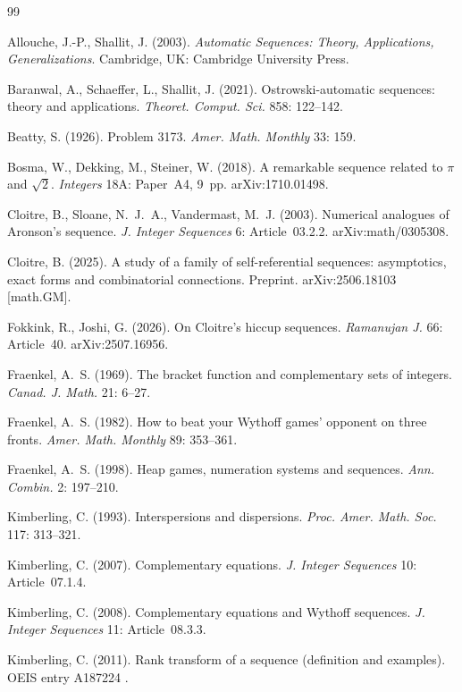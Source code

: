 \documentclass[11pt]{article}
\numberwithin{equation}{section}
\theoremstyle{plain}
\theoremstyle{definition}
\theoremstyle{remark}
\begin{document}
\begin{thebibliography}{99}

Allouche, J.-P., Shallit, J. (2003).
\emph{Automatic Sequences: Theory, Applications, Generalizations}.
Cambridge, UK: Cambridge University Press.

Baranwal, A., Schaeffer, L., Shallit, J. (2021).
Ostrowski-automatic sequences: theory and applications.
\emph{Theoret. Comput. Sci.} 858: 122--142.

Beatty, S. (1926).
Problem 3173.
\emph{Amer. Math. Monthly} 33: 159.

Bosma, W., Dekking, M., Steiner, W. (2018).
A remarkable sequence related to $\pi$ and $\sqrt{2}$.
\emph{Integers} 18A: Paper~A4, 9~pp.
arXiv:1710.01498.

Cloitre, B., Sloane, N.~J.~A., Vandermast, M.~J. (2003).
Numerical analogues of {A}ronson's sequence.
\emph{J. Integer Sequences} 6: Article~03.2.2.
arXiv:math/0305308.

Cloitre, B. (2025).
A study of a family of self-referential sequences:
asymptotics, exact forms and combinatorial connections.
Preprint. arXiv:2506.18103 [math.GM].

Fokkink, R., Joshi, G. (2026).
On {C}loitre's hiccup sequences.
\emph{Ramanujan J.} 66: Article~40.
arXiv:2507.16956.

Fraenkel, A.~S. (1969).
The bracket function and complementary sets of integers.
\emph{Canad. J. Math.} 21: 6--27.

Fraenkel, A.~S. (1982).
How to beat your {W}ythoff games' opponent on three fronts.
\emph{Amer. Math. Monthly} 89: 353--361.

Fraenkel, A.~S. (1998).
Heap games, numeration systems and sequences.
\emph{Ann. Combin.} 2: 197--210.

Kimberling, C. (1993).
Interspersions and dispersions.
\emph{Proc. Amer. Math. Soc.} 117: 313--321.

Kimberling, C. (2007).
Complementary equations.
\emph{J. Integer Sequences} 10: Article~07.1.4.

Kimberling, C. (2008).
Complementary equations and {W}ythoff sequences.
\emph{J. Integer Sequences} 11: Article~08.3.3.

Kimberling, C. (2011).
Rank transform of a sequence (definition and examples).
OEIS entry A187224 \cite{OEIS}.


\end{thebibliography}
\end{document}
